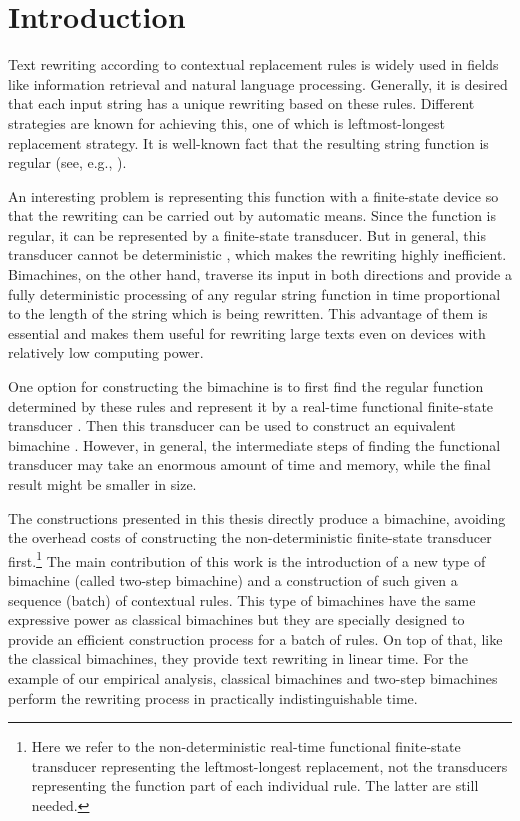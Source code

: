\documentclass{article}
\begin{document}
	\thispagestyle{empty}
	\tableofcontents
	\clearpage
	\setcounter{page}{1}
	\section{Introduction} \label{section:introduction}
	Text rewriting according to contextual replacement rules is widely used in fields like information retrieval and natural language processing. Generally, it is desired that each input string has a unique rewriting based on these rules. Different strategies are known for achieving this, one of which is leftmost-longest replacement strategy. It is well-known fact that the resulting string function is regular (see, e.g., \cite{Kaplan-Kay-1994}).
	
	An interesting problem is representing this function with a finite-state device so that the rewriting can be carried out by automatic means. Since the function is regular, it can be represented by a finite-state transducer. But in general, this transducer cannot be deterministic \cite[remark~5.1.11]{Mihov-FST-2019}, which makes the rewriting highly inefficient. Bimachines, on the other hand, traverse its input in both directions and provide a fully deterministic processing of any regular string function in time proportional to the length of the string which is being rewritten. This advantage of them is essential and makes them useful for rewriting large texts even on devices with relatively low computing power.
	
	One option for constructing the bimachine is to first find the regular function determined by these rules and represent it by a real-time functional finite-state transducer \cite{Kaplan-Kay-1994}. Then this transducer can be used to construct an equivalent bimachine \cite{Gerdjikov-Mihov-Schulz-2017:Bimachines, Gerdjikov-Mihov-Schulz-2019:bimachine-equalizer}.
	However, in general, the intermediate steps of finding the functional transducer may take an enormous amount of time and memory, while the final result might be smaller in size.
	
	The constructions presented in this thesis directly produce a bimachine, avoiding the overhead costs of constructing the non-deterministic finite-state transducer first.\footnote{Here we refer to the non-deterministic real-time functional finite-state transducer representing the leftmost-longest replacement, not the transducers representing the function part of each individual rule. The latter are still needed.}
	The main contribution of this work is the introduction of a new type of bimachine (called two-step bimachine) and a construction of such given a sequence (batch) of contextual rules.
	This type of bimachines have the same expressive power as classical bimachines but they are specially designed to provide an efficient construction process for a batch of rules.
	On top of that, like the classical bimachines, they provide text rewriting in linear time.
	For the example of our empirical analysis, classical bimachines and two-step bimachines perform the rewriting process in practically indistinguishable time.
	
\end{document}
